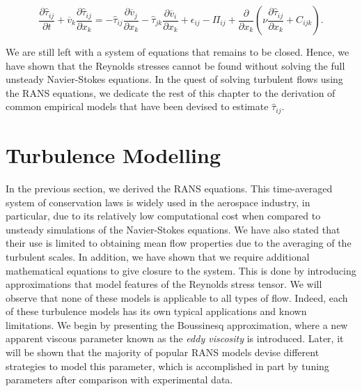\begin{eqBox}
	\begin{equation}
		\frac{\partial \hat \tau_{ij}}{\partial t} + \overline v_k \frac{\partial \hat \tau_{ij}}{\partial x_k}
		= - \hat\tau_{ij}\frac{\partial \overline v_j}{\partial x_k} 
		- \hat\tau_{jk}\frac{\partial \overline v_i }{\partial x_k} 
		+ \epsilon_{ij} - \Pi_{ij}
		+ \frac{\partial}{\partial x_k} \left(\nu \frac{\partial \hat\tau_{ij}}{\partial x_k} + C_{ijk}\right).
	\end{equation}
\end{eqBox}
We are still left with a system of equations that remains to be closed. Hence, we have shown that the Reynolds stresses cannot be found without solving the full unsteady Navier-Stokes equations. In the quest of solving turbulent flows using the RANS equations, we dedicate the rest of this chapter to the derivation of common empirical models that have been devised to estimate $\hat \tau_{ij}$.

\section{Turbulence Modelling}
In the previous section, we derived the RANS equations. This time-averaged system of conservation laws is widely used in the aerospace industry, in particular, due to its relatively low computational cost when compared to unsteady simulations of the Navier-Stokes equations. We have also stated that their use is limited to obtaining mean flow properties due to the averaging of the turbulent scales. In addition, we have shown that we require additional mathematical equations to give closure to the system. This is done by introducing approximations that model features of the Reynolds stress tensor.  We will observe that none of these models is applicable to all types of flow. Indeed, each of these turbulence models has its own typical applications and known limitations. We begin by presenting the Boussinesq approximation, where a new apparent viscous parameter known as the \textit{eddy viscosity} is introduced. Later, it will be shown that the majority of popular RANS models devise different strategies to model this parameter, which is accomplished in part by tuning parameters after comparison with experimental data. 

